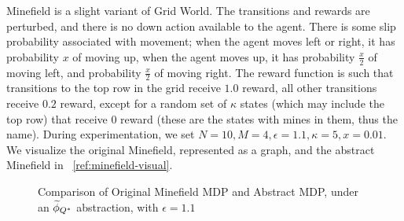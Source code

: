Minefield is a slight variant of Grid World. The transitions and rewards are perturbed, and there is no down action available to the agent. There is some slip probability associated with movement; when the agent moves left or right, it has probability $x$ of moving up, when the agent moves up, it has probability $\frac{x}{2}$ of moving left, and probability $\frac{x}{2}$ of moving right. The reward function is such that transitions to the top row in the grid receive $1.0$ reward, all other transitions receive $0.2$ reward, except for a random set of $\kappa$ states (which may include the top row) that receive $0$ reward (these are the states with mines in them, thus the name). During experimentation, we set $N=10, M=4, \epsilon=1.1, \kappa = 5, x = 0.01$. We visualize the original Minefield, represented as a graph, and the abstract Minefield in ~\ref{ref:minefield-visual}.

\begin{figure}
\label{fig:minefield-visual}
\caption{Comparison of Original Minefield MDP and Abstract MDP, under an $\widetilde \phi_{Q^*}$ abstraction, with $\epsilon=1.1$}
\end{figure} 


